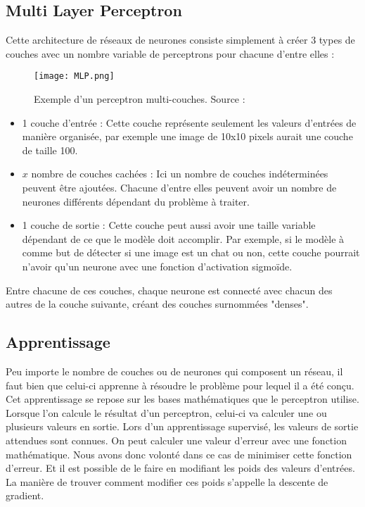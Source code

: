 \subsection{Multi Layer Perceptron}

Cette architecture de réseaux de neurones consiste simplement à créer 3 types de couches avec un nombre variable de perceptrons pour chacune d'entre elles :

\begin{figure}[tbph!]
	\centering
	\texttt{[image: MLP.png]}
	\caption[Exemple d'un perceptron multi-couches]{Exemple d'un perceptron multi-couches. Source : \cite{MLPImage}}
\end{figure}

\begin{itemize}
	\item 1 couche d'entrée : Cette couche représente seulement les valeurs d'entrées de manière organisée, 
	par exemple une image de 10x10 pixels aurait une couche de taille 100. 
	\item $x$ nombre de couches cachées : Ici un nombre de couches indéterminées peuvent être ajoutées. 
	Chacune d'entre elles peuvent avoir un nombre de neurones différents dépendant du problème à traiter.
	\item 1 couche de sortie : Cette couche peut aussi avoir une taille variable dépendant de ce que le modèle doit accomplir. 
	Par exemple, si le modèle à comme but de détecter si une image est un chat ou non, cette couche pourrait n'avoir qu'un neurone avec une fonction d'activation sigmoïde.
\end{itemize}

Entre chacune de ces couches, chaque neurone est connecté avec chacun des autres de la couche suivante, créant des couches surnommées "denses".

\subsection{Apprentissage}

Peu importe le nombre de couches ou de neurones qui composent un réseau, il faut bien que celui-ci apprenne à résoudre le problème pour lequel il a été conçu.
Cet apprentissage se repose sur les bases mathématiques que le perceptron utilise. 
Lorsque l'on calcule le résultat d'un perceptron, celui-ci va calculer une ou plusieurs valeurs en sortie.
Lors d'un apprentissage supervisé, les valeurs de sortie attendues sont connues. On peut calculer une valeur d'erreur avec une fonction mathématique.
Nous avons donc volonté dans ce cas de minimiser cette fonction d'erreur. Et il est possible de le faire en modifiant les poids des valeurs d'entrées. 
La manière de trouver comment modifier ces poids s'appelle la descente de gradient.

